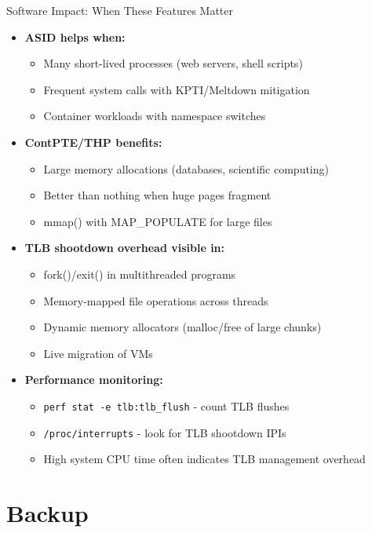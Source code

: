 \documentclass[aspectratio=169,12pt]{beamer}
\begin{document}
\begin{frame}{Software Impact: When These Features Matter}
\begin{itemize}
\item \textbf{ASID helps when:}
    \begin{itemize}
    \item Many short-lived processes (web servers, shell scripts)
    \item Frequent system calls with KPTI/Meltdown mitigation
    \item Container workloads with namespace switches
    \end{itemize}
    
\item \textbf{ContPTE/THP benefits:}
    \begin{itemize}
    \item Large memory allocations (databases, scientific computing)
    \item Better than nothing when huge pages fragment
    \item mmap() with MAP\_POPULATE for large files
    \end{itemize}
    
\item \textbf{TLB shootdown overhead visible in:}
    \begin{itemize}
    \item fork()/exit() in multithreaded programs
    \item Memory-mapped file operations across threads
    \item Dynamic memory allocators (malloc/free of large chunks)
    \item Live migration of VMs
    \end{itemize}
    
\item \textbf{Performance monitoring:}
    \begin{itemize}
    \item \texttt{perf stat -e tlb:tlb\_flush} - count TLB flushes
    \item \texttt{/proc/interrupts} - look for TLB shootdown IPIs
    \item High system CPU time often indicates TLB management overhead
    \end{itemize}
\end{itemize}
\end{frame}

\section{Backup}
\end{document}
